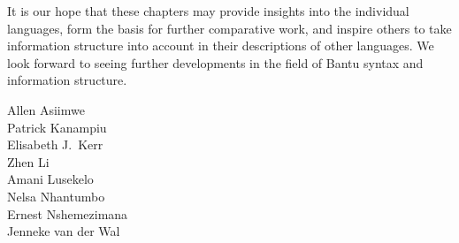 It is our hope that these chapters may provide insights into the individual languages, form the basis for further comparative work, and inspire others to take information structure into account in their descriptions of other languages. We look forward to seeing further developments in the field of Bantu syntax and information structure.\medskip

\begin{flushright}
Allen Asiimwe\\ 
Patrick Kanampiu\\ 
Elisabeth J.\ Kerr\\ 
Zhen Li\\ 
Amani Lusekelo\\ 
Nelsa Nhantumbo\\ 
Ernest Nshemezimana\\ 
Jenneke van der Wal
\end{flushright}

